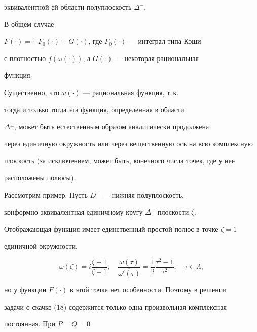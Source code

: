 эквивалентной ей области полуплоскость $\Delta^-$.


В общем случае


$F(\cdot)=\mp F_0(\cdot)+G(\cdot)$, где $F_0(\cdot)$ --- интеграл типа Коши


с плотностью $f(\omega(\cdot))$, а $G(\cdot)$ --- некоторая рациональная


функция.





Существенно, что $\omega(\cdot)$ --- рациональная функция, т.\,к.


тогда и только тогда эта функция, определенная в области


$\Delta^{\pm}$, может быть естественным образом аналитически продолжена


через единичную окружность или через вещественную ось на всю комплексную


плоскость (за исключением, может быть, конечного числа точек, где у нее


расположены полюсы).





Рассмотрим пример. Пусть $D^-$ --- нижняя полуплоскость,


конформно эквивалентная единичному кругу $\Delta^+$ плоскости $\zeta$.


Отображающая функция имеет единственный простой полюс в точке $\zeta=1$


единичной окружности,


$$


\omega(\zeta)=i\frac{\zeta+1}{\zeta-1},\quad


\frac{\omega(\tau)}{\overline{\omega'(\tau)}}=


\frac{1}{2}\frac{\tau^2-1}{\tau^2}, \quad \tau\in\Lambda ,


$$


но у функции $F(\cdot)$ в этой точке нет особенности. Поэтому в решении


задачи о скачке (18) содержится только одна произвольная комплексная


постоянная. При $P=Q=0$


